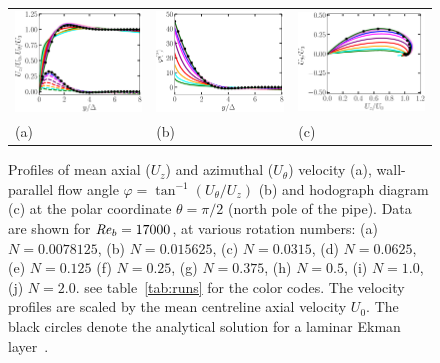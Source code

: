 \documentclass[lineno]{jfm}
\begin{document}
%	 
	\begin{figure}
    	\centering
		\begin{tabular}{lll}
		\includegraphics[width=4.cm]{Figures/ekman_profsy_roty_500_u.eps} &
		\includegraphics[width=4.cm]{Figures/ekman_angles_roty_500_u.eps} &
		\includegraphics[width=4.cm]{Figures/ekman_spiral_roty_500_u.eps} \\
		(a) & (b) & (c) \\	
		\end{tabular}
    	\caption{
    		Profiles of 
		mean axial ($U_z$) and azimuthal ($U_\theta$) velocity
		(a), wall-parallel flow angle $\varphi = \tan^{-1} (U_{\theta}/U_z)$ (b) 
		and hodograph diagram (c) 
		at the polar coordinate $\theta = \pi/2$ (north pole of the pipe).
		Data are shown for $\mbox{\textit{Re}}_b=17000$, at various rotation numbers:
    		(a) $N = 0.0078125$,
                (b) $N = 0.015625$,
                (c) $N = 0.0315$,
                (d) $N = 0.0625$,
                (e) $N = 0.125$
                (f) $N = 0.25$,
                (g) $N = 0.375$,
                (h) $N = 0.5$,
                (i) $N = 1.0$,
                (j) $N = 2.0$.
		see table~\ref{tab:runs} for the color codes.
    		The velocity profiles are scaled by the 
    		mean centreline axial velocity $U_{0}$.
    		The black circles denote the analytical solution 
		for a laminar Ekman layer~\citep{greenspan1968}.
    	}
		\label{fig:Ekman_500}
	\end{figure}
\end{document}
